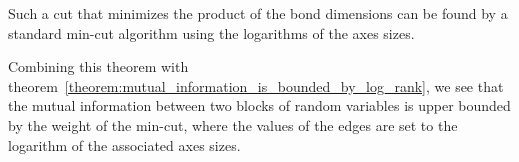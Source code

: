 \documentclass[../../main.tex]{subfiles}
\begin{document}
    \begin{remark}
        Such a cut that minimizes the product of the bond dimensions can be found by a standard min-cut algorithm using the logarithms of the axes sizes.
    \end{remark}

    \begin{remark}
        Combining this theorem with theorem~\ref{theorem:mutual_information_is_bounded_by_log_rank}, we see that the mutual information between two blocks of random variables is upper bounded by the weight of the min-cut, where the values of the edges are set to the logarithm of the associated axes sizes.
    \end{remark}
\end{document}
